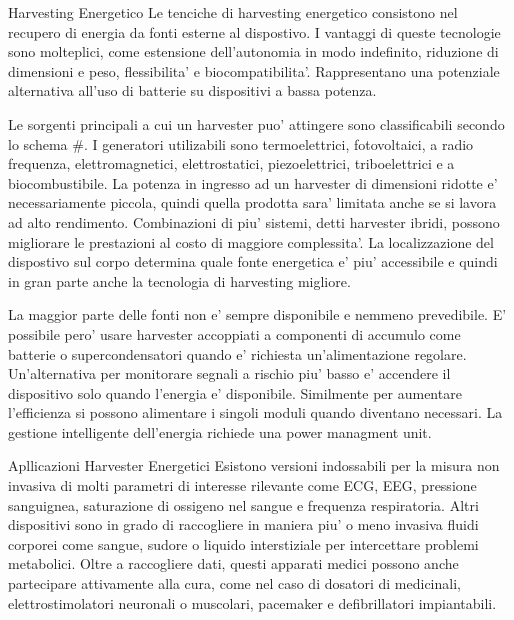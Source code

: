 \begin{multicols}{2}
\begin{section}{Harvesting Energetico}
    Le tenciche di harvesting energetico consistono nel recupero di energia da fonti esterne al dispostivo. I vantaggi di queste tecnologie sono molteplici, come estensione dell'autonomia in modo indefinito, riduzione di dimensioni e peso, flessibilita' e biocompatibilita'. Rappresentano una potenziale alternativa all'uso di batterie su dispositivi a bassa potenza.

    Le sorgenti principali a cui un harvester puo' attingere sono classificabili secondo lo schema \#. I generatori utilizabili sono termoelettrici, fotovoltaici, a radio frequenza, elettromagnetici, elettrostatici, piezoelettrici, triboelettrici e a biocombustibile. La potenza in ingresso ad un harvester di dimensioni ridotte e' necessariamente piccola, quindi quella prodotta sara' limitata anche se si lavora ad alto rendimento. Combinazioni di piu' sistemi, detti harvester ibridi, possono migliorare le prestazioni al costo di maggiore complessita'. La localizzazione del dispostivo sul corpo determina quale fonte energetica e' piu' accessibile e quindi in gran parte anche la tecnologia di harvesting migliore. 
    
    La maggior parte delle fonti non e' sempre disponibile e nemmeno prevedibile. E' possibile pero' usare harvester accoppiati a componenti di accumulo come batterie o supercondensatori quando e' richiesta un'alimentazione regolare. Un'alternativa per monitorare segnali a rischio piu' basso e' accendere il dispositivo solo quando l'energia e' disponibile. Similmente per aumentare l'efficienza si possono alimentare i singoli moduli quando diventano necessari. La gestione intelligente dell'energia richiede una power managment unit.
\end{section}

\begin{section}{Apllicazioni Harvester Energetici}
    Esistono versioni indossabili per la misura non invasiva di molti parametri di interesse rilevante come ECG, EEG, pressione sanguignea, saturazione di ossigeno nel sangue e frequenza respiratoria. Altri dispositivi sono in grado di raccogliere in maniera piu' o meno invasiva fluidi corporei come sangue, sudore o liquido interstiziale per intercettare problemi metabolici. Oltre a raccogliere dati, questi apparati medici possono anche partecipare attivamente alla cura, come nel caso di dosatori di medicinali, elettrostimolatori neuronali o muscolari, pacemaker e defibrillatori impiantabili.
    

\end{section}
\end{multicols}
